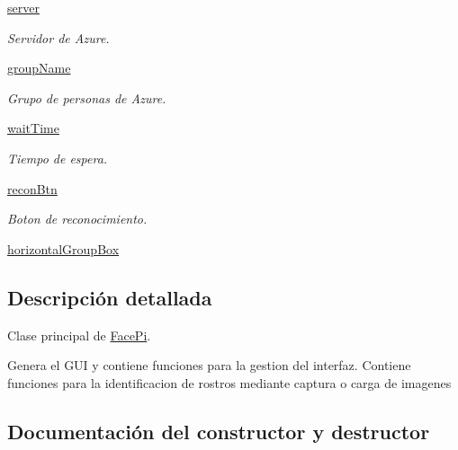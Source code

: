 \begin{DoxyCompactItemize}
\mbox{\hyperlink{classfacepi_1_1_face_pi_a873ed179b2f11752b2105b6926469a48}{server}}
\begin{DoxyCompactList}\small\item\em Servidor de Azure. \end{DoxyCompactList}\item 
\mbox{\hyperlink{classfacepi_1_1_face_pi_a8b55286218a2ba8914171c238f09c7bf}{group\+Name}}
\begin{DoxyCompactList}\small\item\em Grupo de personas de Azure. \end{DoxyCompactList}\item 
\mbox{\hyperlink{classfacepi_1_1_face_pi_a3ca8ad773fedc3dbd86653f4e32e46e9}{wait\+Time}}
\begin{DoxyCompactList}\small\item\em Tiempo de espera. \end{DoxyCompactList}\item 
\mbox{\hyperlink{classfacepi_1_1_face_pi_a3683c8fce62f0046f757d1c8dead6e7b}{recon\+Btn}}
\begin{DoxyCompactList}\small\item\em Boton de reconocimiento. \end{DoxyCompactList}\item 
\mbox{\hyperlink{classfacepi_1_1_face_pi_a14bf82467b2999f4bb10db0c5cf91449}{horizontal\+Group\+Box}}
\end{DoxyCompactItemize}


\subsection{Descripción detallada}
Clase principal de \mbox{\hyperlink{classfacepi_1_1_face_pi}{Face\+Pi}}. 

Genera el G\+UI y contiene funciones para la gestion del interfaz. Contiene funciones para la identificacion de rostros mediante captura o carga de imagenes 

\subsection{Documentación del constructor y destructor}
\mbox{\label{classfacepi_1_1_face_pi_a68ec1ba24536fdb7cc03bc0b6f7a2bee}} 
